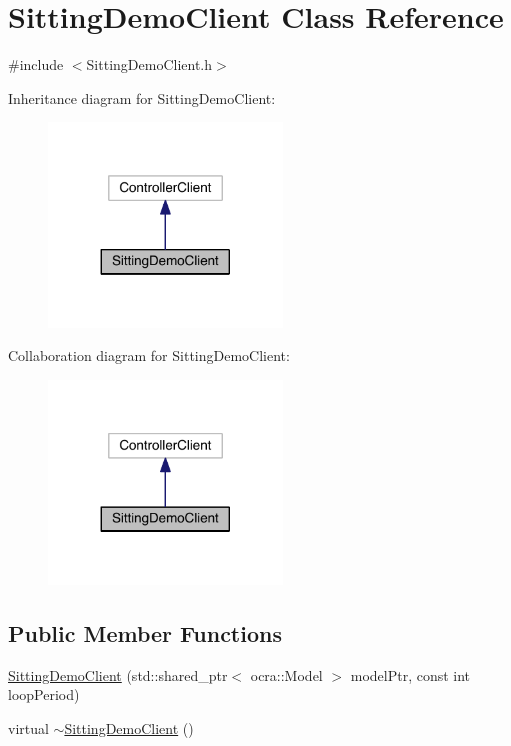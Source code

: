 \hypertarget{classSittingDemoClient}{}\section{Sitting\+Demo\+Client Class Reference}
\label{classSittingDemoClient}


{\ttfamily \#include $<$Sitting\+Demo\+Client.\+h$>$}



Inheritance diagram for Sitting\+Demo\+Client\+:
\nopagebreak
\begin{figure}[H]
\begin{center}
\leavevmode
\includegraphics[width=176pt]{classSittingDemoClient__inherit__graph}
\end{center}
\end{figure}


Collaboration diagram for Sitting\+Demo\+Client\+:
\nopagebreak
\begin{figure}[H]
\begin{center}
\leavevmode
\includegraphics[width=176pt]{classSittingDemoClient__coll__graph}
\end{center}
\end{figure}
\subsection*{Public Member Functions}
\begin{DoxyCompactItemize}
\item 
\hyperlink{classSittingDemoClient_aedcb6c4ad7b4fa19f1b188e700c0a079}{Sitting\+Demo\+Client} (std\+::shared\+\_\+ptr$<$ ocra\+::\+Model $>$ model\+Ptr, const int loop\+Period)
\item 
virtual \hyperlink{classSittingDemoClient_a0fb7ded5e44b2b60d7f89c22386154b7}{$\sim$\+Sitting\+Demo\+Client} ()
\end{DoxyCompactItemize}

